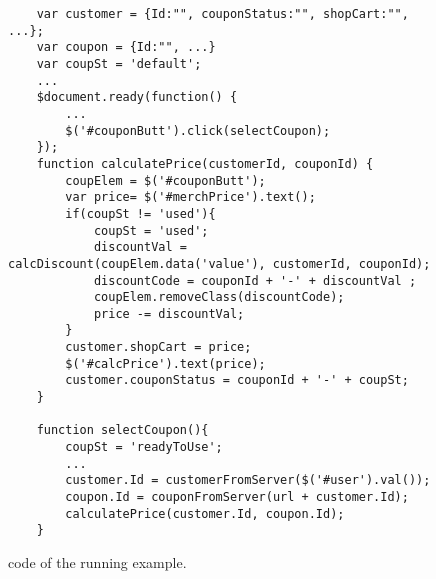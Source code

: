 \begin{figure}
\begin{lstlisting}
	var customer = {Id:"", couponStatus:"", shopCart:"", ...};
	var coupon = {Id:"", ...}
	var coupSt = 'default';
	...
	$document.ready(function() {
		...
		$('#couponButt').click(selectCoupon);
	});
	function calculatePrice(customerId, couponId) {
		coupElem = $('#couponButt');
		var price= $('#merchPrice').text();
		if(coupSt != 'used'){
			coupSt = 'used';
			discountVal = calcDiscount(coupElem.data('value'), customerId, couponId);
			discountCode = couponId + '-' + discountVal ;
			coupElem.removeClass(discountCode); 
			price -= discountVal;	
		}
		customer.shopCart = price;
		$('#calcPrice').text(price);
		customer.couponStatus = couponId + '-' + coupSt;  
	}
	
	function selectCoupon(){
		coupSt = 'readyToUse';
		...
		customer.Id = customerFromServer($('#user').val());
		coupon.Id = couponFromServer(url + customer.Id);
		calculatePrice(customer.Id, coupon.Id);
	}

\end{lstlisting}
\vspace{-0.1in} 

\caption{\javascript code of the running example.}
\label{Fig:example}
\vspace{-0.2in} 

\end{figure}
